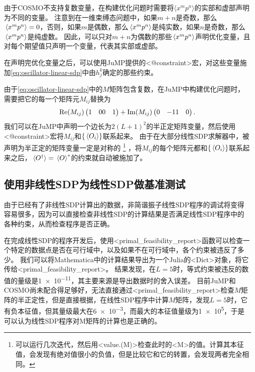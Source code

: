 \documentclass[oneside]{fduthesis}
\def\\{}%
\def\texttt#1{<#1>}%
\begin{document}
由于COSMO不支持复数变量，在构建优化问题时需要将$\langle x^m p^n \rangle$的实部和虚部声明为不同的变量。
注意到在一维束缚态问题中，如果$m+n$是奇数，那么$\expval*{x^m p^n} = 0$，否则，如果$m$是偶数，那么$\expval*{x^m p^n}$是纯实数，如果$n$是奇数，那么$\expval*{x^m p^n}$是纯虚数。
因此，可以只对$m+n$为偶数的那些$\expval*{x^m p^n}$声明优化变量，且对每个期望值只声明一个变量，代表其实部或虚部。

在声明完优化变量之后，可以使用JuMP提供的\texttt{@constraint}宏，对这些变量施加\eqref{eq:oscillator-linear-sdp}中由$h_j^k$确定的那些约束。

由于\eqref{eq:oscillator-linear-sdp}中的$M$矩阵包含复数，在JuMP中构建优化问题时，需要把它的每一个矩阵元$M_{ij}$替换为
\begin{equation}
    \Re(M_{ij}) \pmqty{1 & 0 \\ 0 & 1} + \Im(M_{ij}) \pmqty{0 & -1 \\ 1 & 0}.
\end{equation}
我们可以在JuMP中声明一个边长为$2(L+1)^2$的半正定矩阵变量，然后使用\texttt{@constraint}宏将$M_{ij}$和$\{\expval*{O_i}\}$联系起来。
由于在大部分线性SDP求解器中，被声明为半正定的矩阵变量一定是对称的%
\footnote{可以运行几次迭代，然后用\texttt{value.(M)}检查此时的\texttt{M}的值。计算其本征值，会发现有绝对值很小的负值，但是比较它和它的转置，会发现两者完全相同。}%
，将$M_{ij}$的每个矩阵元都和$\{\expval*{O_i}\}$联系起来之后，$\expval*{O^\dagger} = \expval*{O}^*$的约束就自动被施加了。

\subsection{使用非线性SDP为线性SDP做基准测试}

由于已经有了非线性SDP计算出的数据，非简谐振子线性SDP程序的调试将变得容易很多，因为可以直接检查非线性SDP的计算结果是否满足线性SDP程序中的各种约束，从而检查程序是否正确。

在完成线性SDP的程序开发后，使用\texttt{primal\_feasibility\_report}函数可以检查一个特定的数据点是否在可行域中，以及如果不在可行域中，各个约束被违反了多少。
我们可以将Mathematica中的计算结果导出为一个Julia的\texttt{Dict}对象，将它传给\texttt{primal\_feasibility\_report}。
结果发现，在$L=5$时，等式约束被违反的数值的量级是\num{1e-11}，其主要来源是导出数据时的舍入误差。
目前JuMP和COSMO尚未配合得足够好，无法直接通过\texttt{primal\_feasibility\_report}检查$M$矩阵的半正定性，但是直接根据，在线性SDP程序中计算$M$矩阵，发现$L=5$时，它有负本征值，但其量级最大在\num{6e-3}，而最大的本征值量级为\num{1e5}，于是可以认为线性SDP程序对M矩阵的计算也是正确的。
\end{document}
